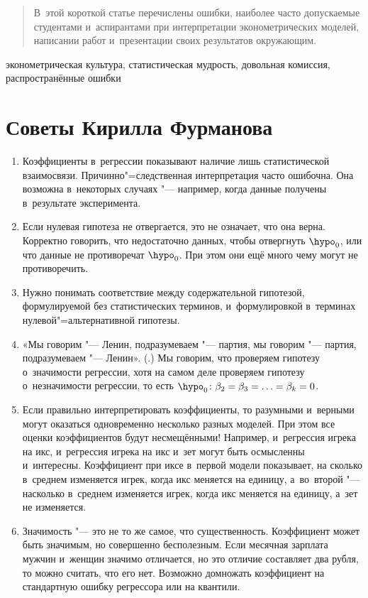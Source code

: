 \documentclass[11pt]{article}
\begin{document}

\DoFirstPageTechnicalStuff


\begin{abstract}
В~этой короткой статье перечислены ошибки, наиболее часто допускаемые студентами и~аспирантами при интерпретации эконометрических моделей, написании работ и~презентации своих результатов окружающим.
\end{abstract}

\begin{keyword}
эконометрическая культура, статистическая мудрость, довольная комиссия, распространённые ошибки
\end{keyword}

\section{Советы Кирилла Фурманова}

\begin{enumerate}
	\item Коэффициенты в~регрессии показывают наличие лишь статистической взаимосвязи. Причинно"=следственная интерпретация часто ошибочна. Она возможна в~некоторых случаях "--- например, когда данные получены в~результате эксперимента.
	\item Если нулевая гипотеза не отвергается, это не означает, что она верна. Корректно говорить, что недостаточно данных, чтобы отвергнуть $\hypo_0$, или что данные не противоречат $\hypo_0$. При этом они ещё много чему могут не противоречить.
	\item Нужно понимать соответствие между содержательной гипотезой, формулируемой без статистических терминов, и~формулировкой в~терминах нулевой"=альтернативной гипотезы. 
	\item «Мы говорим "--- Ленин, подразумеваем "--- партия, мы говорим "--- партия, подразумеваем "--- Ленин». (\cite{mayakovskiy}.) Мы говорим, что проверяем гипотезу о~значимости регрессии, хотя на самом деле проверяем гипотезу о~незначимости регрессии, то есть $\hypo_0\colon \beta_2=\beta_3=\ldots=\beta_k=0$. 
	\item Если правильно интерпретировать коэффициенты, то разумными и~верными могут оказаться одновременно несколько разных моделей. При этом все оценки коэффициентов будут несмещёнными! Например, и~регрессия игрека на икс, и~регрессия игрека на икс и~зет могут быть осмысленны и~интересны. Коэффициент при иксе в~первой модели показывает, на сколько в~среднем изменяется игрек, когда икс меняется на единицу, а~во~второй "--- насколько в~среднем изменяется игрек, когда икс меняется на единицу, а~зет не изменяется.
	\item Значимость "--- это не то же самое, что существенность. Коэффициент может быть значимым, но совершенно бесполезным. Если месячная зарплата мужчин и~женщин значимо отличается, но это отличие составляет два рубля, то можно считать, что его нет. Возможно домножать коэффициент на стандартную ошибку регрессора или на квантили.
\end{enumerate}
\end{document}
